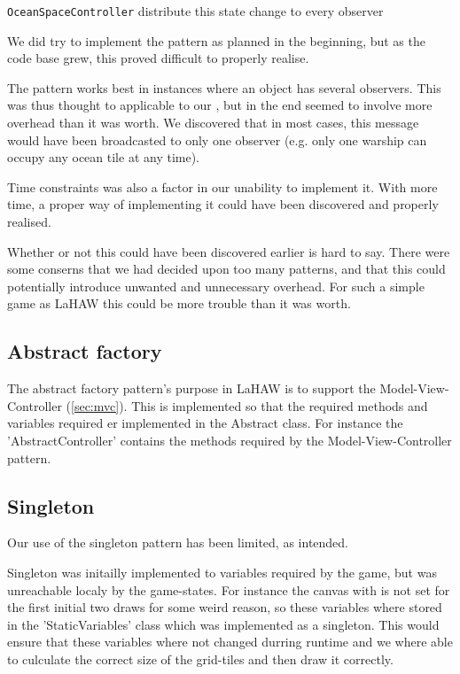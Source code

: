 \texttt{OceanSpaceController} distribute this state change to every observer

We did try to implement the pattern as planned in the beginning, but as the code base grew, this proved difficult to properly realise.

The pattern works best in instances where an object has several observers. This was thus thought to applicable to our 
, but in the end seemed to involve more overhead than it was worth. We discovered that in most cases, this message would have been broadcasted to only one observer (e.g. only one warship can occupy any ocean tile at any time).

Time constraints was also a factor in our unability to implement it. With more time, a proper way of implementing it could have been discovered and properly realised.

Whether or not this could have been discovered earlier is hard to say. There were some conserns that we had decided upon too many patterns, and that this could potentially introduce unwanted and unnecessary overhead. For such a simple game as LaHAW this could be more trouble than it was worth.



\subsection{Abstract factory}
\label{sec:absfac}
The abstract factory pattern's purpose in LaHAW is to support the Model-View-Controller (\ref{sec:mvc}). This is implemented so that the required methods and variables required er implemented in the Abstract class. For instance the 'AbstractController' contains the methods required by the Model-View-Controller pattern.


\subsection{Singleton}
Our use of the singleton pattern has been limited, as intended.

Singleton was initailly implemented to variables required by the game, but was unreachable localy by the game-states.
For instance the canvas with is not set for the first initial two draws for some weird reason, so these variables where stored in the 'StaticVariables' class which was implemented as a singleton. This would ensure that these variables where not changed durring runtime and we where able to culculate the correct size of the grid-tiles and then draw it correctly.


